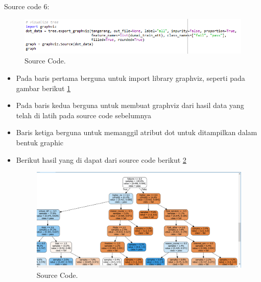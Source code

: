 Source code 6:
		\begin{figure}[ht]
		\centerline{\includegraphics[width=1\textwidth]{figures/im/imQ6.png}}
		\caption{Source Code.}
		\label{enamQ}
		\end{figure}
\begin{itemize}
\item Pada baris pertama berguna untuk import library graphviz, seperti pada gambar berikut \ref{enamQ}
\item Pada baris kedua berguna untuk membuat graphviz dari hasil data yang telah di latih pada source code sebelumnya
\item Baris ketiga berguna untuk memanggil atribut dot untuk ditampilkan dalam bentuk graphic
\item Berikut hasil yang di dapat dari source code berikut \ref{enamC}
		\begin{figure}[ht]
		\centerline{\includegraphics[width=1\textwidth]{figures/im/imCode6.png}}
		\caption{Source Code.}
		\label{enamC}
		\end{figure}
\end{itemize}

